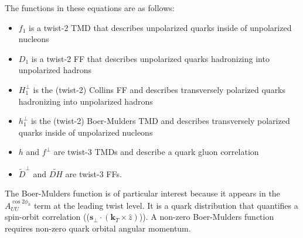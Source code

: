 The functions in these equations are as follows:
\begin{itemize}
\item $f_1$ is a twist-2 TMD that describes unpolarized quarks inside of unpolarized nucleons
\item $D_1$ is a twist-2 FF that describes unpolarized quarks hadronizing into unpolarized hadrons
\item $H_1^\perp$ is the (twist-2) Collins FF and describes transversely polarized quarks hadronizing into unpolarized hadrons
\item $h_1^\perp$ is the (twist-2) Boer-Mulders TMD and describes transversely polarized quarks inside of unpolarized nucleons
\item $h$ and $f^\perp$ are twist-3 TMDs and describe a quark gluon correlation
\item $\tilde{D}^\perp$ and $\tilde{DH}$ are twist-3 FFs.
\end{itemize}
The Boer-Mulders function is of particular interest because it appears in the $A_{UU}^{\cos 2\phi_h}$ term at the leading twist level.
It is a quark distribution that quantifies a spin-orbit correlation (\mbox{($\textbf{s}_\perp \cdot (\textbf{k}_T \times \hat{z})$)}).
A non-zero Boer-Mulders function requires non-zero quark orbital angular momentum.
